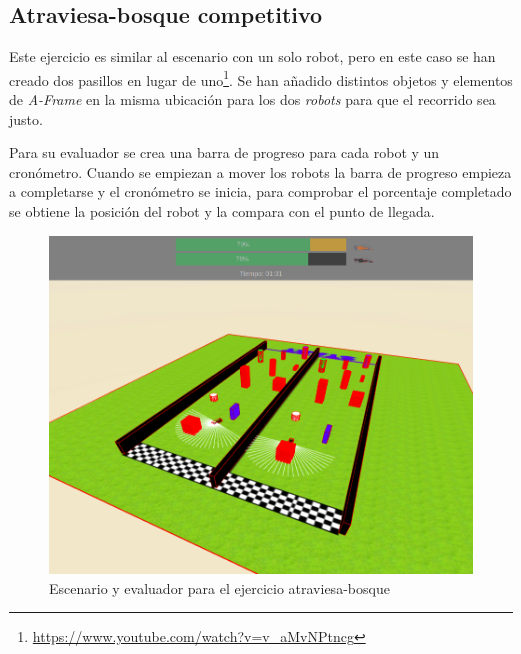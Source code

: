 \subsection{Atraviesa-bosque competitivo}
\label{subsec:bosquecmp}
Este ejercicio es similar al escenario con un solo robot, pero en este caso se han creado dos pasillos en lugar de uno\footnote{\url{https://www.youtube.com/watch?v=v_aMvNPtncg}}. Se han añadido distintos objetos y elementos de \textit{A-Frame} en la misma ubicación para los dos \textit{robots} para que el recorrido sea justo.

Para su evaluador se crea una barra de progreso para cada robot y un cronómetro. Cuando se empiezan a mover los robots la barra de progreso empieza a completarse y el cronómetro se inicia, para comprobar el porcentaje completado se obtiene la posición del robot y la compara con el punto de llegada.

\begin{figure}[H]
\centering           
\includegraphics[scale=0.3]{img/evaluador_forest.png}
\caption{Escenario y evaluador para el ejercicio atraviesa-bosque}
\label{fig:evaluador_bosque}
\end{figure}


